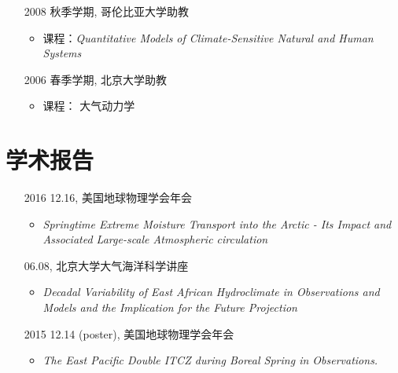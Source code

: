 \documentclass[11pt]{article}
\newcommand{\meetingName}[1]{#1}
\newcommand{\ptitle}[1]{\textit{#1}}
\begin{document}
\begin{CJK*}{UTF8}{gkai}
\begin{itemize}[leftmargin=10ex,label={},noitemsep,nolistsep]
	\item[2008] 秋季学期, 哥伦比亚大学助教
	\begin{itemize}[leftmargin=0ex,label={},noitemsep,nolistsep]
		\item 课程：\textit{Quantitative Models of Climate-Sensitive Natural and Human Systems}
		\end{itemize}
		
	\item[2006] 春季学期, 北京大学助教
	\begin{itemize}[leftmargin=0ex,label={},noitemsep,nolistsep]
		\item 课程： 大气动力学 %
		\end{itemize}
	\end{itemize}



\section{学术报告}
\begin{itemize}[leftmargin=10ex,label={},noitemsep,nolistsep]
    \item[2016] 12.16, \meetingName{美国地球物理学会年会}
    \begin{itemize}[leftmargin=4ex,label={},noitemsep,nolistsep]
		\item \ptitle{Springtime Extreme Moisture Transport into the Arctic - Its Impact and Associated Large-scale Atmospheric circulation}
		\end{itemize}

	\item[\phantom{2016}] 06.08, \meetingName{北京大学大气海洋科学讲座}
	\begin{itemize}[leftmargin=4ex,label={},noitemsep,nolistsep]
		\item \ptitle{Decadal Variability of East African Hydroclimate in Observations and Models and the Implication for the Future Projection}
		\end{itemize}
	
	\item[2015]12.14 (poster),  \meetingName{美国地球物理学会年会}
	\begin{itemize}[leftmargin=4ex,label={},noitemsep,nolistsep]
		\item \ptitle{The East Pacific Double ITCZ during Boreal Spring in Observations.}
		\end{itemize}
	

\end{itemize}
\end{CJK*}
\end{document}
